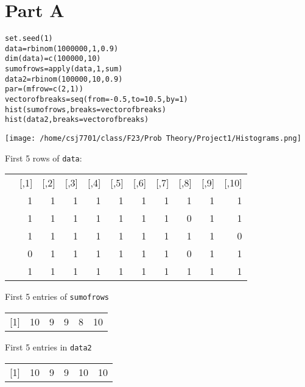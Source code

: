 \documentclass[11pt]{article}
\author{Christian}
\date{\today}
\title{}
\begin{document}
\section*{Part A}
\label{sec:orgb6365eb}
\begin{verbatim}
set.seed(1)
data=rbinom(1000000,1,0.9)
dim(data)=c(100000,10)
sumofrows=apply(data,1,sum)
data2=rbinom(100000,10,0.9)
par=(mfrow=c(2,1))
vectorofbreaks=seq(from=-0.5,to=10.5,by=1)
hist(sumofrows,breaks=vectorofbreaks)
hist(data2,breaks=vectorofbreaks)
\end{verbatim}

\begin{figure*}
\centering
\texttt{[image: /home/csj7701/class/F23/Prob Theory/Project1/Histograms.png]}
\bicaption{---}
\end{figure*}

First 5 rows of \texttt{data}:

\begin{center}
\begin{tabular}{lrrrrrrrrrr}
 & [,1] & [,2] & [,3] & [,4] & [,5] & [,6] & [,7] & [,8] & [,9] & [,10]\\[0pt]
[1,] & 1 & 1 & 1 & 1 & 1 & 1 & 1 & 1 & 1 & 1\\[0pt]
[2,] & 1 & 1 & 1 & 1 & 1 & 1 & 1 & 0 & 1 & 1\\[0pt]
[3,] & 1 & 1 & 1 & 1 & 1 & 1 & 1 & 1 & 1 & 0\\[0pt]
[4,] & 0 & 1 & 1 & 1 & 1 & 1 & 1 & 0 & 1 & 1\\[0pt]
[5,] & 1 & 1 & 1 & 1 & 1 & 1 & 1 & 1 & 1 & 1\\[0pt]
\end{tabular}
\end{center}

First 5 entries of \texttt{sumofrows}

\begin{center}
\begin{tabular}{lrrrrr}
[1] & 10 & 9 & 9 & 8 & 10\\[0pt]
\end{tabular}
\end{center}

First 5 entries in \texttt{data2}

\begin{center}
\begin{tabular}{lrrrrr}
[1] & 10 & 9 & 9 & 10 & 10\\[0pt]
\end{tabular}
\end{center}
\end{document}
